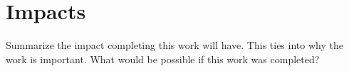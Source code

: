\section{Impacts}
\label{sec:impact}

Summarize the impact completing this work will have. This ties into why the
work is important. What would be possible if this work was completed?
